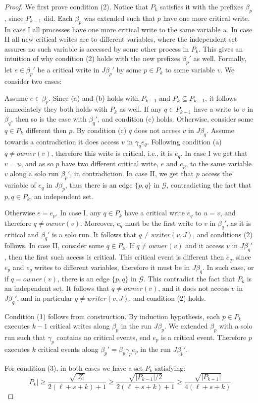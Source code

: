  \begin{proof}
 	We first prove condition (2). Notice that $P_k$ satisfies it with the prefixes $\beta_p$, since $P_{k-1}$ did. Each $\beta_p$ was extended such that $p$ have one more critical write. In case I all processes have one more critical write to the same variable $u$. In case II all new critical writes are to different variables, where the independent set assures no such variable is accessed by some other process in $P_k$. This gives an intuition of why condition (2) holds with the new prefixes $\beta_p'$ as well. Formally, let $e \in \beta_p'$ be a critical write in $J \beta_p'$ by some $p \in P_k$ to some variable $v$. We consider two cases:
 	
 	Assume $e \in \beta_p$. Since (a) and (b) holds with $P_{k-1}$ and $P_k \subseteq P_{k-1}$, it follows immediately they both holds with $P_k$ as well. If any $q \in P_{k-1}$ have a write to $v$ in $\beta_q$, then so is the case with $\beta_q'$, and condition (c) holds. Otherwise, consider some $q \in P_k$ different then $p$. By condition (c) $q$ does not access $v$ in $J \beta_q$. Assume towards a contradiction it does access $v$ in $\gamma_q e_q$. Following condition (a) $q \neq owner(v)$, therefore this write is critical, i.e., it is $e_q$. In case I we get that $v=u$, and as so $p$ have two different critical write, $e$ and $e_p$, to the same variable $v$ along a solo run $\beta_p'$, in contradiction. In case II, we get that $p$ access the variable of $e_q$ in $J \beta_p$, thus there is an edge $\{p,q\}$ in $\mathcal{G}$, contradicting the fact that $p,q \in P_k$, an independent set.
 	
 	Otherwise $e=e_p$.
 	In case I, any $q \in P_k$ have a critical write $e_q$ to $u=v$, and therefore $q \neq owner(v)$. Moreover, $e_q$ must be the first write to $v$ in $\beta_q'$, as it is critical and $\beta_q'$ is a solo run. It follows that $q \neq writer(v,J)$, and conditions (2) follows.
 	In case II, consider some $q \in P_k$. If $q \neq owner(v)$ and it access $v$ in $J \beta_q'$, then the first such access is critical. This critical event is different then $e_q$, since $e_p$ and $e_q$ writes to different variables, therefore it must be in $J \beta_q$. In such case, or if $q = owner(v)$, there is an edge $\{p,q\}$ in $\mathcal{G}$. This contradict the fact that $P_k$ is an independent set. It follows that $q \neq owner(v)$, and it does not access $v$ in $J \beta_q'$, and in particular $q \neq writer(v,J)$, and condition (2) holds.
 	
 	Condition (1) follows from construction. By induction hypothesis, each $p \in P_k$ executes $k-1$ critical writes along $\beta_p$ in the run $J \beta_p$. We extended $\beta_p$ with a solo run such that $\gamma_p$ contains no critical events, end $e_p$ is a critical event. Therefore $p$ executes $k$ critical events along $\beta_p' = \beta_p \gamma_p e_p$ in the run $J \beta_p'$.
 	
 	For condition (3), in both cases we have a set $P_k$ satisfying:
 	$$|P_k| \geq \frac{\sqrt{|Z|}}{2(\ell+s+k)+1} \geq \frac{\sqrt{|P_{k-1}|/2}}{2(\ell+s+k)+1} \geq \frac{\sqrt{|P_{k-1}|}}{4(\ell+s+k)}$$
 \end{proof}

